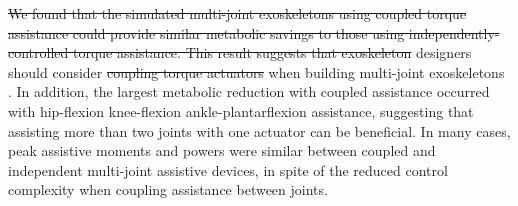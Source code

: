 \documentclass[10pt,letterpaper]{article}
\providecommand{\DIFaddtex}[1]{{\protect\color{blue}{#1}}} %
\providecommand{\DIFdeltex}[1]{{\protect\color{red}\sout{#1}}}                      %
\providecommand{\DIFaddbegin}{} %
\providecommand{\DIFaddend}{} %
\providecommand{\DIFdelbegin}{} %
\providecommand{\DIFdelend}{} %
\providecommand{\DIFadd}[1]{\texorpdfstring{\DIFaddtex{#1}}{#1}} %
\providecommand{\DIFdel}[1]{\texorpdfstring{\DIFdeltex{#1}}{}} %
\newcommand{\DIFscaledelfig}{0.5}
\newlength{\DIFdelgraphicswidth} %
\newlength{\DIFdelgraphicsheight} %
\newcommand{\DIFaddincludegraphics}[2][]{{\color{blue}\fbox{\DIFOincludegraphics[#1]{#2}}}} %
\newcommand{\DIFdelincludegraphics}[2][]{%
\sbox{\DIFdelgraphicsbox}{\DIFOincludegraphics[#1]{#2}}%
\settoboxwidth{\DIFdelgraphicswidth}{\DIFdelgraphicsbox} %
\settoboxtotalheight{\DIFdelgraphicsheight}{\DIFdelgraphicsbox} %
\scalebox{\DIFscaledelfig}{%
\parbox[b]{\DIFdelgraphicswidth}{\usebox{\DIFdelgraphicsbox}\\[-\baselineskip] \rule{\DIFdelgraphicswidth}{0em}}\llap{\resizebox{\DIFdelgraphicswidth}{\DIFdelgraphicsheight}{%
\setlength{\unitlength}{\DIFdelgraphicswidth}%
\begin{picture}(1,1)%
\thicklines\linethickness{2pt} %
{\color[rgb]{1,0,0}\put(0,0){\framebox(1,1){}}}%
{\color[rgb]{1,0,0}\put(0,0){\line( 1,1){1}}}%
{\color[rgb]{1,0,0}\put(0,1){\line(1,-1){1}}}%
\end{picture}%
}*{3pt}}} %
} %
\DeclareRobustCommand{\DIFaddbegin}{\DIFOaddbegin \let\includegraphics\DIFaddincludegraphics} %
\DeclareRobustCommand{\DIFaddend}{\DIFOaddend \let\includegraphics\DIFOincludegraphics} %
\DeclareRobustCommand{\DIFdelbegin}{\DIFOdelbegin \let\includegraphics\DIFdelincludegraphics} %
\DeclareRobustCommand{\DIFdelend}{\DIFOaddend \let\includegraphics\DIFOincludegraphics} %
\begin{document}
\DIFdel{We found that the simulated multi-joint exoskeletons using coupled torque assistance could provide similar metabolic savings to those using independently-controlled torque assistance. This result suggests that exoskeleton }\DIFdelend \DIFaddbegin \DIFadd{Our results suggests that }\DIFaddend designers should consider \DIFdelbegin \DIFdel{coupling torque actuators }\DIFdelend \DIFaddbegin \DIFadd{coupled multi-joint assistance }\DIFaddend when building multi-joint exoskeletons \DIFaddbegin \DIFadd{since coupled devices could reduce device weight and simplify device architecture by requiring fewer actuators}\DIFaddend . In addition, the largest metabolic reduction with coupled assistance occurred with hip-flexion knee-flexion ankle-plantarflexion assistance, suggesting that assisting more than two joints with one actuator can be beneficial. In many cases, peak assistive moments and powers were similar between coupled and independent multi-joint assistive devices, in spite of the reduced control complexity when coupling assistance between joints.
\end{document}
